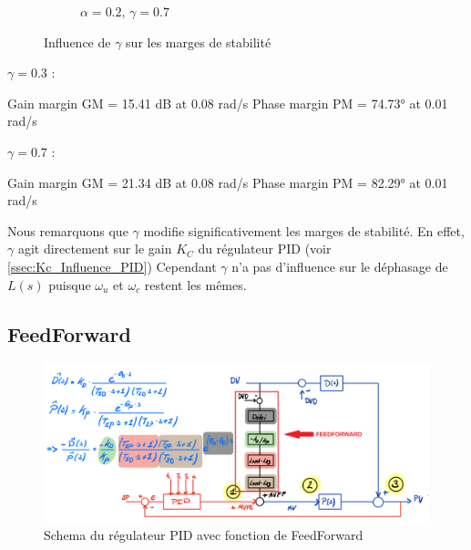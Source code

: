 \begin{enumerate}
\begin{figure}[H]
\begin{subfigure}[b]{0.48\textwidth}
            \caption{$\alpha = 0.2,\, \gamma = 0.7$}
        \end{subfigure}
        \caption{Influence de $\gamma$ sur les marges de stabilité}
        \label{fig:MarginsAlpha}
    \end{figure}
    $\gamma = 0.3$ :
    \begin{python*}
    Gain margin GM = 15.41 dB at 0.08 rad/s
    Phase margin PM = 74.73° at 0.01 rad/s   
    \end{python*}
    $\gamma = 0.7$ :
    \begin{python*}
    Gain margin GM = 21.34 dB at 0.08 rad/s
    Phase margin PM = 82.29° at 0.01 rad/s
    \end{python*}
    Nous remarquons que $\gamma$ modifie significativement les marges de stabilité. En effet, $\gamma$ agit directement sur le gain $K_C$ du régulateur PID (voir \ref{ssec:Kc_Influence_PID})
    Cependant $\gamma$ n'a pas d'influence sur le déphasage de $L(s)$ puisque $\omega_u$ et $\omega_c$ restent les mêmes.
\end{enumerate}


\subsection{FeedForward}

\begin{figure}[h]
    \centering
    \includegraphics[width=\textwidth]{figures/schemaFF.png}
    \caption{Schema du régulateur PID avec fonction de FeedForward}
	\label{fig:schemaFF}
\end{figure}

